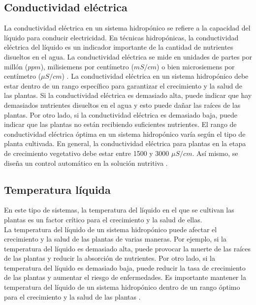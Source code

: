 \subsection{Conductividad eléctrica}
La conductividad eléctrica en un sistema hidropónico se refiere a la capacidad del líquido para conducir electricidad. En técnicas hidropónicas, la conductividad eléctrica del líquido es un indicador importante de la cantidad de nutrientes disueltos en el agua. La conductividad eléctrica se mide en unidades de partes por millón ($ppm$), milisiemens por centímetro ($mS/cm$) o bien microsiemens por centímetro ($\mu S/cm$) . La conductividad eléctrica en un sistema hidropónico debe estar dentro de un rango específico para garantizar el crecimiento y la salud de las plantas. Si la conductividad eléctrica es demasiado alta, puede indicar que hay demasiados nutrientes disueltos en el agua y esto puede dañar las raíces de las plantas. Por otro lado, si la conductividad eléctrica es demasiado baja, puede indicar que las plantas no están recibiendo suficientes nutrientes. El rango de conductividad eléctrica óptima en un sistema hidropónico varía según el tipo de planta cultivada. En general, la conductividad eléctrica para plantas en la etapa de crecimiento vegetativo debe estar entre 1500 y 3000 $\mu S/cm$. Así mismo, se diseña un control automático en la solución nutritiva \cite{carrasco2007efecto}.

\subsection{Temperatura líquida}

En este tipo de sistemas, la temperatura del líquido en el que se cultivan las plantas es un factor crítico para el crecimiento y la salud de ellas.
\\
La temperatura del líquido de un sistema hidropónico puede afectar el crecimiento y la salud de las plantas de varias maneras. Por ejemplo, si la temperatura del líquido es demasiado alta, puede provocar la muerte de las raíces de las plantas y reducir la absorción de nutrientes. Por otro lado, si la temperatura del líquido es demasiado baja, puede reducir la tasa de crecimiento de las plantas y aumentar el riesgo de enfermedades. Es importante mantener la temperatura del líquido de un sistema hidropónico dentro de un rango óptimo para el crecimiento y la salud de las plantas \cite{carrasco2007efecto}.

